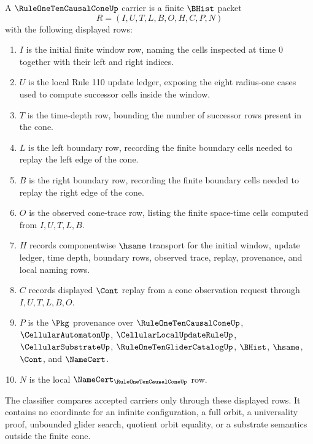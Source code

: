 \begin{definition}
\label{def:rule-one-ten-causal-cone-carrier}
A $\RuleOneTenCausalConeUp$ carrier is a finite $\BHist$ packet
$$
R=(I,U,T,L,B,O,H,C,P,N)
$$
with the following displayed rows:
\begin{enumerate}
\item $I$ is the initial finite window row, naming the cells inspected at time
$0$ together with their left and right indices.
\item $U$ is the local Rule 110 update ledger, exposing the eight radius-one
cases used to compute successor cells inside the window.
\item $T$ is the time-depth row, bounding the number of successor rows present
in the cone.
\item $L$ is the left boundary row, recording the finite boundary cells needed
to replay the left edge of the cone.
\item $B$ is the right boundary row, recording the finite boundary cells needed
to replay the right edge of the cone.
\item $O$ is the observed cone-trace row, listing the finite space-time cells
computed from $I,U,T,L,B$.
\item $H$ records componentwise $\hsame$ transport for the initial window,
update ledger, time depth, boundary rows, observed trace, replay, provenance,
and local naming rows.
\item $C$ records displayed $\Cont$ replay from a cone observation request
through $I,U,T,L,B,O$.
\item $P$ is the $\Pkg$ provenance over $\RuleOneTenCausalConeUp$,
$\CellularAutomatonUp$, $\CellularLocalUpdateRuleUp$,
$\CellularSubstrateUp$, $\RuleOneTenGliderCatalogUp$, $\BHist$, $\hsame$,
$\Cont$, and $\NameCert$.
\item $N$ is the local $\NameCert_{\RuleOneTenCausalConeUp}$ row.
\end{enumerate}
The classifier compares accepted carriers only through these displayed rows. It
contains no coordinate for an infinite configuration, a full orbit, a
universality proof, unbounded glider search, quotient orbit equality, or a
substrate semantics outside the finite cone.
\end{definition}

